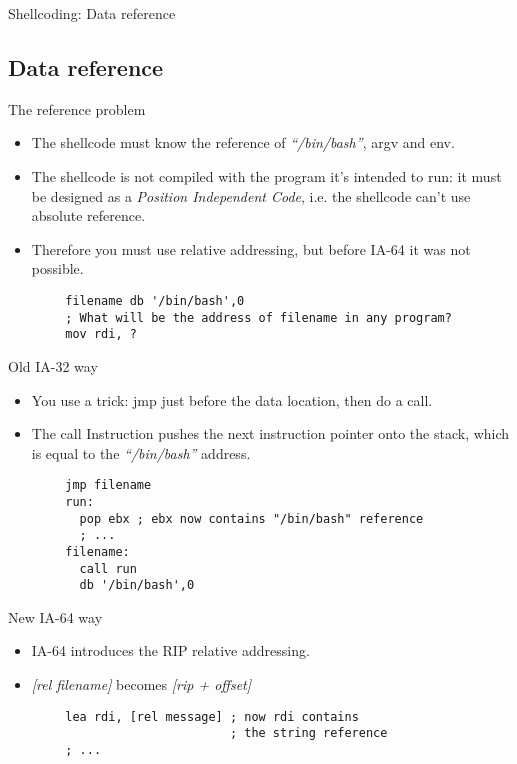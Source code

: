 \begin{frame}{Shellcoding: Data reference}
	\subsection{Data reference}
	\begin{block}{The reference problem}
		\begin{itemize}
			\item The shellcode must know the reference of \emph{``/bin/bash''}, argv and env.
			\item The shellcode is not compiled with the program it's intended to run: it must be designed as a \emph{Position Independent Code}, i.e. the shellcode can't use absolute reference.
			\item Therefore you must use relative addressing, but before IA-64 it was not possible.
		\end{itemize}
	\end{block}
	\acode
	\begin{lstlisting}
		filename db '/bin/bash',0
		; What will be the address of filename in any program?
		mov rdi, ?
	\end{lstlisting}

	\framebreak

	\begin{block}{Old IA-32 way}
		\begin{itemize}
			\item You use a trick: jmp just before the data location, then do a
				call.
			\item The call Instruction pushes the next instruction pointer onto the
				stack, which is equal to the \emph{``/bin/bash''} address.
		\end{itemize}
	\end{block}
	\acode
	\begin{lstlisting}
		jmp filename
		run:
		  pop ebx ; ebx now contains "/bin/bash" reference
		  ; ...
		filename:
		  call run
		  db '/bin/bash',0
	\end{lstlisting}
	\begin{block}{New IA-64 way}
		\begin{itemize}
			\item IA-64 introduces the RIP relative addressing.
			\item \emph{[rel filename]} becomes \emph{[rip + offset]}
		\end{itemize}
	\end{block}
	\acode
	\begin{lstlisting}
		lea rdi, [rel message] ; now rdi contains
		                       ; the string reference
		; ...


\end{lstlisting}
\end{frame}
